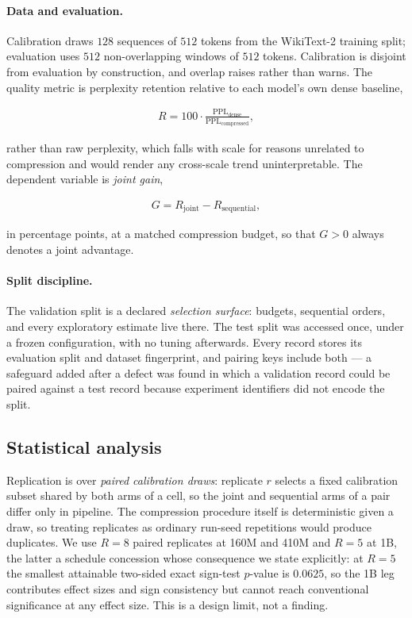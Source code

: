 \paragraph{Data and evaluation.} Calibration draws $128$ sequences of $512$ tokens from the
WikiText-2 training split; evaluation uses $512$ non-overlapping windows of $512$ tokens.
Calibration is disjoint from evaluation by construction, and overlap raises rather than
warns. The quality metric is perplexity retention relative to each model's own dense
baseline,

\begin{align}
  R = 100 \cdot \frac{\mathrm{PPL}_{\mathrm{dense}}}{\mathrm{PPL}_{\mathrm{compressed}}},
  \label{eq:retention}
\end{align}

rather than raw perplexity, which falls with scale for reasons unrelated to compression and
would render any cross-scale trend uninterpretable. The dependent variable is \emph{joint
gain},

\begin{align}
  G = R_{\mathrm{joint}} - R_{\mathrm{sequential}},
  \label{eq:gain}
\end{align}

in percentage points, at a matched compression budget, so that $G > 0$ always denotes a
joint advantage.

\paragraph{Split discipline.} The validation split is a declared \emph{selection surface}:
budgets, sequential orders, and every exploratory estimate live there. The test split was
accessed once, under a frozen configuration, with no tuning afterwards. Every record stores
its evaluation split and dataset fingerprint, and pairing keys include both --- a safeguard
added after a defect was found in which a validation record could be paired against a
test record because experiment identifiers did not encode the split.

\subsection{Statistical analysis}
\label{subsec:stats}

Replication is over \emph{paired calibration draws}: replicate $r$ selects a fixed
calibration subset shared by both arms of a cell, so the joint and sequential arms of a pair
differ only in pipeline. The compression procedure itself is deterministic given a draw,
so treating replicates as ordinary run-seed repetitions would produce duplicates. We use
$R = 8$ paired replicates at 160M and 410M and $R = 5$ at 1B, the latter a schedule
concession whose consequence we state explicitly: at $R = 5$ the smallest attainable
two-sided exact sign-test $p$-value is $0.0625$, so the 1B leg contributes effect sizes and
sign consistency but cannot reach conventional significance at any effect size. This is a
design limit, not a finding.

